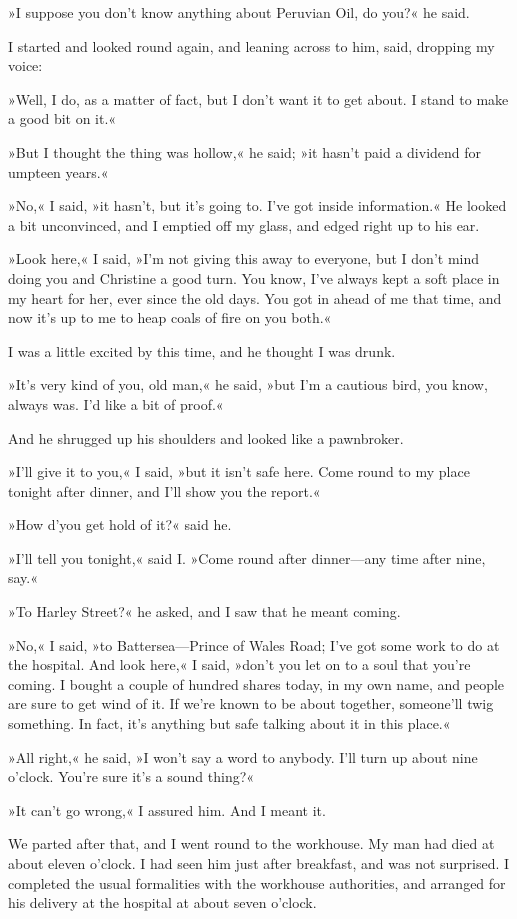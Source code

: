 »I suppose you don't know anything about Peruvian Oil, do you?« he said.

I started and looked round again, and leaning across to him, said, dropping my voice:

»Well, I do, as a matter of fact, but I don't want it to get about. I stand to make a good bit on it.«

»But I thought the thing was hollow,« he said; »it hasn't paid a dividend for umpteen years.«

»No,« I said, »it hasn't, but it's going to. I've got inside information.« He looked a bit unconvinced, and I emptied off my glass, and edged right up to his ear.

»Look here,« I said, »I'm not giving this away to everyone, but I don't mind doing you and Christine a good turn. You know, I've always kept a soft place in my heart for her, ever since the old days. You got in ahead of me that time, and now it's up to me to heap coals of fire on you both.«

I was a little excited by this time, and he thought I was drunk.

»It's very kind of you, old man,« he said, »but I'm a cautious bird, you know, always was. I'd like a bit of proof.«

And he shrugged up his shoulders and looked like a pawnbroker.

»I'll give it to you,« I said, »but it isn't safe here. Come round to my place tonight after dinner, and I'll show you the report.«

»How d'you get hold of it?« said he.

»I'll tell you tonight,« said I\@. »Come round after dinner—any time after nine, say.«

»To Harley Street?« he asked, and I saw that he meant coming.

»No,« I said, »to Battersea—Prince of Wales Road; I've got some work to do at the hospital. And look here,« I said, »don't you let on to a soul that you're coming. I bought a couple of hundred shares today, in my own name, and people are sure to get wind of it. If we're known to be about together, someone'll twig something. In fact, it's anything but safe talking about it in this place.«

»All right,« he said, »I won't say a word to anybody. I'll turn up about nine o'clock. You're sure it's a sound thing?«

»It can't go wrong,« I assured him. And I meant it.

We parted after that, and I went round to the workhouse. My man had died at about eleven o'clock. I had seen him just after breakfast, and was not surprised. I completed the usual formalities with the workhouse authorities, and arranged for his delivery at the hospital at about seven o'clock.

